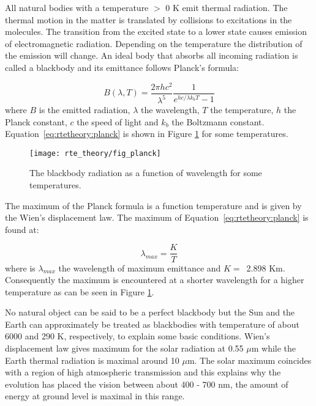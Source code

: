  \label{sec:rtetheory:planck}
 
 All natural bodies with a temperature $>$ 0 K emit thermal radiation.
 The thermal motion in the matter is translated by collisions to
 excitations in the molecules. The transition from the excited state
 to a lower state causes emission of electromagnetic radiation.
 Depending on the temperature the distribution of the emission will
 change. An ideal body that absorbs all incoming radiation is called a
 blackbody and its emittance follows Planck's formula: 

 \begin{equation}
   B(\lambda,T) = \frac{2\pi hc^2}{\lambda^5} \frac{1}{e^{hc/\lambda k_bT}-1}
  \label{eq:rtetheory:planck}
 \end{equation}
 where $B$ is the emitted radiation, $\lambda$ the wavelength, $T$ the 
 temperature, $h$ the Planck constant, $c$ the speed of light and $k_b$
 the Boltzmann constant. Equation~\ref{eq:rtetheory:planck} is shown in Figure 
 \ref{fig:rtetheory:planck} for some temperatures.

 \begin{figure}
  \begin{center}
   \texttt{[image: rte\_theory/fig\_planck]}
    \caption{The blackbody radiation as a function of wavelength for
             some temperatures.}
    \label{fig:rtetheory:planck}
  \end{center}
 \end{figure}   
                                       
 The maximum of the Planck formula is a function temperature and is
 given by the Wien's displacement law. The maximum of
 Equation~\ref{eq:rtetheory:planck} is found at: 

 \begin{equation}
   \lambda_{max} = \frac{K}{T}
  \label{eq:rtetheory:wien}
 \end{equation}
 where is $\lambda_{max}$ the wavelength of maximum emittance and $K
 =$~2.898 Km. Consequently the maximum is encountered
 at a shorter wavelength for a higher temperature as can be seen in
 Figure \ref{fig:rtetheory:planck}.
                                     
 No natural object can be said to be a perfect blackbody but the Sun
 and the Earth can approximately be treated as blackbodies with
 temperature of about 6000 and 290 K, respectively, to explain some
 basic conditions. Wien's displacement law gives maximum for the solar
 radiation at 0.55 $\mu$m while the Earth thermal radiation is maximal
 around 10 $\mu$m. The solar maximum coincides with a region of high
 atmospheric transmission and this explains why the
 evolution has placed the vision between about 400 - 700 nm, the
 amount of energy at ground level is maximal in this range.  
 
